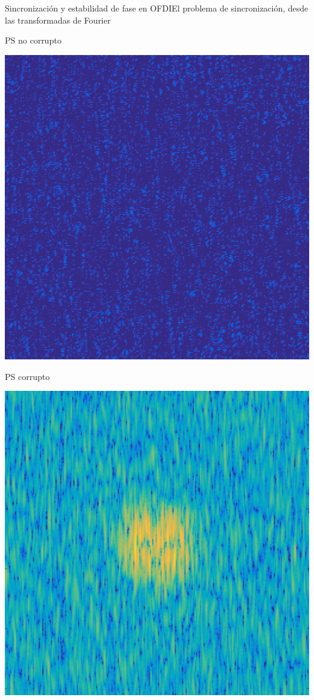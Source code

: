\documentclass[fleqn,10pt]{beamer}
\begin{document}
\begin{frame}{Sincronización y estabilidad de fase en OFDI}{El problema de sincronización, desde las transformadas de Fourier}
\begin{minipage}{0.3\linewidth}
		PS no corrupto
		
		\includegraphics[width=0.7\linewidth]{AAUgraphics/pt4/psf_clean_pdf}
		
		PS corrupto
	\end{minipage}
	\hfill
	\begin{minipage}{0.3\linewidth}
		\centering
	
		\includegraphics[width=0.7\linewidth]{AAUgraphics/pt4/psf_partial_corrupt}
		

\end{minipage}
\end{frame}
\end{document}
